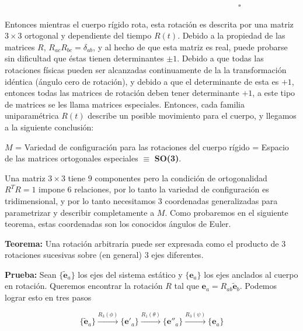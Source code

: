 \documentclass[a4paper,10pt]{article}
\numberwithin{equation}{section}
\newcommand{\teorema}{\textbf{Teorema: }}
\newcommand{\prueba}{\textbf{Prueba: }}
\begin{document}
$\hspace{12cm} \square$

\vspace{.3cm}

Entonces mientras el cuerpo rígido rota, esta rotación es descrita por una matriz 
$3\times 3$ ortogonal y dependiente del tiempo $R(t)$. Debido a la propiedad de 
las matrices $R$, $R_{ac}R_{bc} = \delta_{ab}$, y al hecho de que esta matriz es 
real, puede probarse sin dificultad que éstas tienen determinantes $\pm 1$. Debido 
a que todas las rotaciones físicas pueden ser alcanzadas continuamente de la 
la transformación idéntica (ángulo cero de rotación), y debido a que el determinante 
de esta es $+1$, entonces todas las matrices de rotación deben tener determinante $+1$, 
a este tipo de matrices se les llama matrices especiales. Entonces, cada familia uniparamétrica $R(t)$ describe un posible movimiento para 
el cuerpo, y llegamos a la siguiente conclusión:

\begin{center}
 $M$ = Variedad de configuración para  las rotaciones del cuerpo rígido = Espacio de las matrices 
 ortogonales especiales $\equiv$ \textbf{SO(3)}.
\end{center}

\vspace{.3cm}

Una matriz $3\times 3$ tiene $9$ componentes pero la condición de ortogonalidad $R^TR=1$
impone $6$ relaciones, por lo tanto la variedad de configuración es tridimensional, y 
por lo tanto necesitamos $3$ coordenadas generalizadas para parametrizar y describir 
completamente a $M$. Como probaremos en el siguiente teorema, estas coordenadas son 
los conocidos ángulos de Euler.

\teorema Una rotación arbitraria puede ser expresada como el producto de $3$ rotaciones 
sucesivas sobre (en general) $3$ ejes diferentes.

\vspace{.3cm}

\prueba Sean $\{{\tilde{\mathbf{e}}_a\}}$ los ejes del sistema estático y 
$\{{\mathbf{e}_a\}}$ los ejes anclados al cuerpo en rotación. Queremos encontrar 
la rotación $R$ tal que $\mathbf{e}_a = R_{ab}{\tilde{\mathbf{e}}_b}$. Podemos 
lograr esto en tres pasos

\begin{equation}
 \{{\tilde{\mathbf{e}}_a\}} \xrightarrow{R_3(\phi)} 
 \{{\mathbf{e}'_a\}} \xrightarrow{R_1(\theta)} 
 \{{\mathbf{e}''_a\}} \xrightarrow{R_3(\psi)} \{{\mathbf{e}_a\}}
\end{equation}
\end{document}
